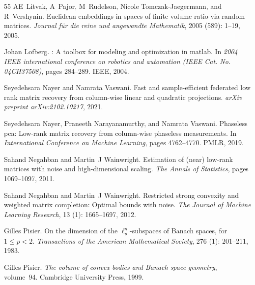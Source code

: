 \documentclass[11pt]{article}
\begin{document}
\begin{thebibliography}{55}
AE~Litvak, A~Pajor, M~Rudelson, Nicole Tomczak-Jaegermann, and R~Vershynin.
\newblock Euclidean embeddings in spaces of finite volume ratio via random
  matrices.
\newblock \emph{Journal f{\"u}r die reine und angewandte Mathematik},
  2005 (589): 1--19, 2005.

Johan Lofberg.
: A toolbox for modeling and optimization in matlab.
\newblock In \emph{2004 IEEE international conference on robotics and
  automation (IEEE Cat. No. 04CH37508)}, pages 284--289. IEEE, 2004.

Seyedehsara Nayer and Namrata Vaswani.
\newblock Fast and sample-efficient federated low rank matrix recovery from
  column-wise linear and quadratic projections.
\newblock \emph{arXiv preprint arXiv:2102.10217}, 2021.

Seyedehsara Nayer, Praneeth Narayanamurthy, and Namrata Vaswani.
\newblock Phaseless pca: Low-rank matrix recovery from column-wise phaseless
  measurements.
\newblock In \emph{International Conference on Machine Learning}, pages
  4762--4770. PMLR, 2019.

Sahand Negahban and Martin~J Wainwright.
\newblock Estimation of (near) low-rank matrices with noise and
  high-dimensional scaling.
\newblock \emph{The Annals of Statistics}, pages 1069--1097, 2011.

Sahand Negahban and Martin~J Wainwright.
\newblock Restricted strong convexity and weighted matrix completion: Optimal
  bounds with noise.
\newblock \emph{The Journal of Machine Learning Research}, 13
  (1): 1665--1697, 2012.

Gilles Pisier.
\newblock On the dimension of the $\ell^n_p$-subspaces of {B}anach spaces, for
  $1 \leq p < 2$.
\newblock \emph{Transactions of the American Mathematical Society},
  276 (1): 201--211, 1983.

Gilles Pisier.
\newblock \emph{The volume of convex bodies and {B}anach space geometry},
  volume~94.
\newblock Cambridge University Press, 1999.


\end{thebibliography}
\end{document}
